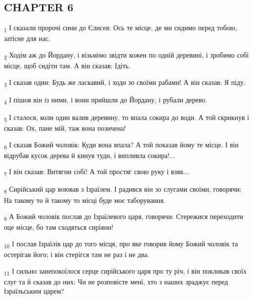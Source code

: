 \subsection{CHAPTER 6}
\begin{tcolorbox}
\textsubscript{1} І сказали пророчі сини до Єлисея: Ось те місце, де ми сидимо перед тобою, затісне для нас.
\end{tcolorbox}
\begin{tcolorbox}
\textsubscript{2} Ходім аж до Йордану, і візьмімо звідти кожен по одній деревині, і зробимо собі місце, щоб сидіти там. А він сказав: Ідіть.
\end{tcolorbox}
\begin{tcolorbox}
\textsubscript{3} І сказав один: Будь же ласкавий, і ходи зо своїми рабами! А він сказав: Я піду.
\end{tcolorbox}
\begin{tcolorbox}
\textsubscript{4} І пішов він із ними, і вони прийшли до Йордану, і рубали дерево.
\end{tcolorbox}
\begin{tcolorbox}
\textsubscript{5} І сталося, коли один валив деревину, то впала сокира до води. А той скрикнув і сказав: Ох, пане мій, таж вона позичена!
\end{tcolorbox}
\begin{tcolorbox}
\textsubscript{6} І сказав Божий чоловік: Куди вона впала? А той показав йому те місце. І він відрубав кусок дерева й кинув туди, і випливла сокира!...
\end{tcolorbox}
\begin{tcolorbox}
\textsubscript{7} І він сказав: Витягни собі! А той простяг свою руку і взяв...
\end{tcolorbox}
\begin{tcolorbox}
\textsubscript{8} Сирійський цар воював з Ізраїлем. І радився він зо слугами своїми, говорячи: На такому то й такому то місці буде моє таборування.
\end{tcolorbox}
\begin{tcolorbox}
\textsubscript{9} А Божий чоловік послав до Ізраїлевого царя, говорячи: Стережися переходити оце місце, бо там сходяться сиріяни!
\end{tcolorbox}
\begin{tcolorbox}
\textsubscript{10} І послав Ізраїлів цар до того місця, про яке говорив йому Божий чоловік та остерігав його; і він стерігся там не раз і не два.
\end{tcolorbox}
\begin{tcolorbox}
\textsubscript{11} І сильно занепокоїлося серце сирійського царя про ту річ, і він покликав своїх слуг та й сказав до них: Чи не розповісте мені, хто з наших зраджує перед Ізраїльським царем?
\end{tcolorbox}
